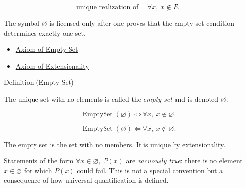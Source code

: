 \begin{remark*}
\[
  \text{unique realization of }\quad \forall x,\ x\notin E.
\]
\end{remark*}

\begin{remark*}[Interpretation]
The symbol \(\varnothing\) is licensed only after one proves that the
empty-set condition determines exactly one set.
\end{remark*}

\begin{dependencies}
\begin{itemize}
  \item \hyperref[ax:empty-set]{Axiom of Empty Set}
  \item \hyperref[ax:extensionality]{Axiom of Extensionality}
\end{itemize}
\end{dependencies}

\begin{definitionbox}{Definition (Empty Set)}
\begin{definition}\label{def:empty-set}
The unique set with no elements is called the \emph{empty set} and is denoted
$\varnothing$.
\end{definition}
\end{definitionbox}

\begin{remark*}
\[
  \operatorname{EmptySet}(\varnothing)
  \iff
  \forall x,\ x\notin\varnothing.
\]
\end{remark*}

\begin{remark*}
\[
  \operatorname{EmptySet}(\varnothing)
  \iff
  \forall x,\ x\notin\varnothing.
\]
\end{remark*}

\begin{remark*}[Interpretation]
The empty set is the set with no members. It is unique by extensionality.
\end{remark*}

\begin{remark*}[Exposition]
Statements of the form $\forall x \in \varnothing,\; P(x)$ are
\emph{vacuously true}: there is no element $x \in \varnothing$ for which
$P(x)$ could fail. This is not a special convention but a consequence of
how universal quantification is defined.
\end{remark*}

